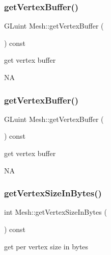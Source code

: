 \subsubsection{\texorpdfstring{get\+Vertex\+Buffer()}{getVertexBuffer()}\hspace{0.1cm}{\footnotesize\ttfamily [1/2]}}
{\footnotesize\ttfamily G\+Luint Mesh\+::get\+Vertex\+Buffer (\begin{DoxyParamCaption}{ }\end{DoxyParamCaption}) const}

get vertex buffer

NA \mbox{\label{classMesh_a6424c1f70f73adcc51b23cee023b00c4}} 
\subsubsection{\texorpdfstring{get\+Vertex\+Buffer()}{getVertexBuffer()}\hspace{0.1cm}{\footnotesize\ttfamily [2/2]}}
{\footnotesize\ttfamily G\+Luint Mesh\+::get\+Vertex\+Buffer (\begin{DoxyParamCaption}{ }\end{DoxyParamCaption}) const}

get vertex buffer

NA \mbox{\label{classMesh_ac76eaa9d09b9198494e48c4323ae1628}} 
\subsubsection{\texorpdfstring{get\+Vertex\+Size\+In\+Bytes()}{getVertexSizeInBytes()}\hspace{0.1cm}{\footnotesize\ttfamily [1/2]}}
{\footnotesize\ttfamily int Mesh\+::get\+Vertex\+Size\+In\+Bytes (\begin{DoxyParamCaption}{ }\end{DoxyParamCaption}) const}

get per vertex size in bytes \mbox{\label{classMesh_ac76eaa9d09b9198494e48c4323ae1628}} 
